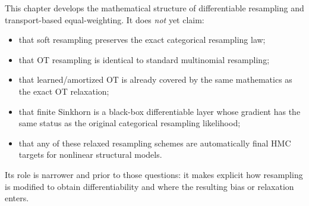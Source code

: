 This chapter develops the mathematical structure of differentiable resampling
and transport-based equal-weighting.  It does \emph{not} yet claim:
\begin{itemize}
  \item that soft resampling preserves the exact categorical resampling law;
  \item that OT resampling is identical to standard multinomial resampling;
  \item that learned/amortized OT is already covered by the same mathematics as
    the exact OT relaxation;
  \item that finite Sinkhorn is a black-box differentiable layer whose gradient
    has the same status as the original categorical resampling likelihood;
  \item that any of these relaxed resampling schemes are automatically final
    HMC targets for nonlinear structural models.
\end{itemize}
Its role is narrower and prior to those questions: it makes explicit how
resampling is modified to obtain differentiability and where the resulting bias
or relaxation enters.
